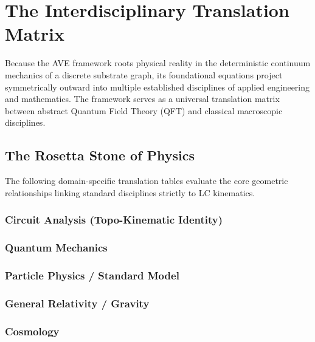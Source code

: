 \appendix

\chapter{The Interdisciplinary Translation Matrix}
\label{app:translation_matrix}

Because the AVE framework roots physical reality in the deterministic continuum mechanics of a discrete substrate graph, its foundational equations project symmetrically outward into multiple established disciplines of applied engineering and mathematics. The framework serves as a universal translation matrix between abstract Quantum Field Theory (QFT) and classical macroscopic disciplines.

\section{The Rosetta Stone of Physics}

The following domain-specific translation tables evaluate the core geometric relationships linking standard disciplines strictly to LC kinematics.

\subsection{Circuit Analysis (Topo-Kinematic Identity)}


\subsection{Quantum Mechanics}


\subsection{Particle Physics / Standard Model}


\subsection{General Relativity / Gravity}


\subsection{Cosmology}


